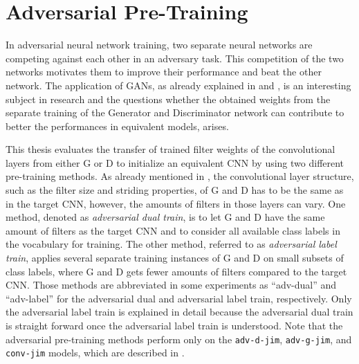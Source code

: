
\section{Adversarial Pre-Training}\label{sec:nn_adv}
In adversarial neural network training, two separate neural networks are competing against each other in an adversary task.
This competition of the two networks motivates them to improve their performance and beat the other network.
The application of GANs, as already explained in  and , is an interesting subject in research and the questions whether the obtained weights from the separate training of the Generator and Discriminator network can contribute to better the performances in equivalent models, arises.

This thesis evaluates the transfer of trained filter weights of the convolutional layers from either G or D to initialize an equivalent CNN by using two different pre-training methods.
As already mentioned in , the convolutional layer structure, such as the filter size and striding properties, of G and D has to be the same as in the target CNN, however, the amounts of filters in those layers can vary.
One method, denoted as \emph{adversarial dual train}, is to let G and D have the same amount of filters as the target CNN and to consider all available class labels in the vocabulary for training.
The other method, referred to as \emph{adversarial label train}, applies several separate training instances of G and D on small subsets of class labels, where G and D gets fewer amounts of filters compared to the target CNN.
Those methods are abbreviated in some experiments as \enquote{adv-dual} and \enquote{adv-label} for the adversarial dual and adversarial label train, respectively.
Only the adversarial label train is explained in detail because the adversarial dual train is straight forward once the adversarial label train is understood.
Note that the adversarial pre-training methods perform only on the \texttt{adv-d-jim}, \texttt{adv-g-jim}, and \texttt{conv-jim} models, which are described in .



